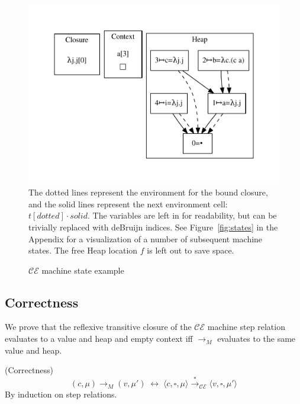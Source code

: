 \begin{figure}
\includegraphics[width=\linewidth]{figures/18.pdf}
The dotted lines represent the environment for the bound closure, and the solid
lines represent the next environment cell:  $t[dotted] \cdot solid$. The
variables are left in for readability, but can be trivially replaced with
deBruijn indices. See Figure~\ref{fig:states} in the Appendix for a
visualization of a number of subsequent machine states. The free Heap location
$f$ is left out to save space.
\caption{$\mathcal{CE}$ machine state example}
\label{fig:state}
\end{figure}

\subsection{Correctness}
We prove that the reflexive transitive closure of the $\mathcal{CE}$ machine
step relation evaluates to a value and heap and empty context iff
$\xrightarrow{}_{M}$ evaluates to the same value and heap.

{\prop \textnormal{(Correctness)} $$(c, \mu) \rightarrow_{M} (v, \mu') \;
\leftrightarrow \; \langle c, \square, \mu \rangle \xrightarrow{*
}_{\mathcal{CE}} \langle v, \square, \mu' \rangle $$} 
By induction on step relations. 
